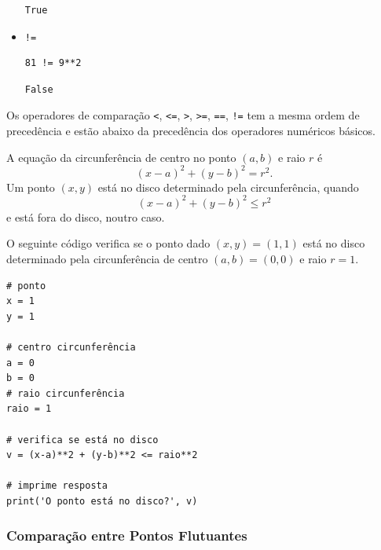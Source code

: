 \begin{itemize}
\begin{verbatim}
True
\end{verbatim}

\item \lstinline+!=+ 

\begin{lstlisting}[xrightmargin=2.5em]
81 != 9**2
\end{lstlisting}

\begin{verbatim}
False
\end{verbatim}

\end{itemize}

\begin{obs}
  Os operadores de comparação \lstinline+<+, \lstinline+<=+, \lstinline+>+, \lstinline+>=+, \lstinline+==+, \lstinline+!=+ tem a mesma ordem de precedência e estão abaixo da precedência dos operadores numéricos básicos.
\end{obs}

\begin{ex}
  A equação da circunferência de centro no ponto $(a, b)$ e raio $r$ é
  \begin{equation}
    (x-a)^2 + (y-b)^2 = r^2.
  \end{equation}
  Um ponto $(x, y)$ está no disco determinado pela circunferência, quando
  \begin{equation}
    (x-a)^2 + (y-b)^2 \leq r^2
  \end{equation}
  e está fora do disco, noutro caso.

  O seguinte código verifica se o ponto dado $(x, y) = (1, 1)$ está no disco determinado pela circunferência de centro $(a, b) = (0, 0)$ e raio $r = 1$.

  
\begin{lstlisting}
# ponto
x = 1
y = 1

# centro circunferência
a = 0
b = 0
# raio circunferência
raio = 1

# verifica se está no disco
v = (x-a)**2 + (y-b)**2 <= raio**2

# imprime resposta
print('O ponto está no disco?', v)
\end{lstlisting}

\end{ex}

\subsubsection{Comparação entre Pontos Flutuantes}

